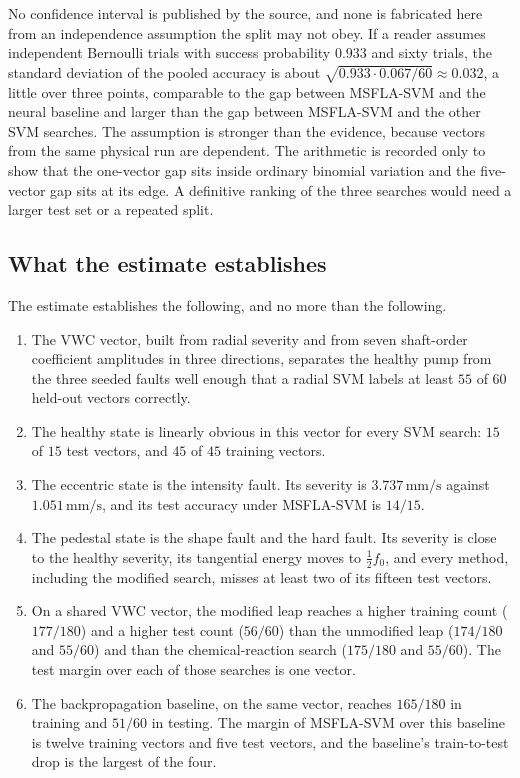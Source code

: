 No confidence interval is published by the source, and none is fabricated here from an independence assumption the split may not obey.
If a reader assumes independent Bernoulli trials with success probability \(0.933\) and sixty trials, the standard deviation of the pooled accuracy is about \(\sqrt{0.933\cdot 0.067/60}\approx 0.032\), a little over three points, comparable to the gap between MSFLA-SVM and the neural baseline and larger than the gap between MSFLA-SVM and the other SVM searches.
The assumption is stronger than the evidence, because vectors from the same physical run are dependent.
The arithmetic is recorded only to show that the one-vector gap sits inside ordinary binomial variation and the five-vector gap sits at its edge.
A definitive ranking of the three searches would need a larger test set or a repeated split.

\subsection{What the estimate establishes}

The estimate establishes the following, and no more than the following.
\begin{enumerate}
\item The VWC vector, built from radial severity and from seven shaft-order coefficient amplitudes in three directions, separates the healthy pump from the three seeded faults well enough that a radial SVM labels at least \(55\) of \(60\) held-out vectors correctly.
\item The healthy state is linearly obvious in this vector for every SVM search: \(15\) of \(15\) test vectors, and \(45\) of \(45\) training vectors.
\item The eccentric state is the intensity fault.
Its severity is \(3.737\,\mathrm{mm/s}\) against \(1.051\,\mathrm{mm/s}\), and its test accuracy under MSFLA-SVM is \(14/15\).
\item The pedestal state is the shape fault and the hard fault.
Its severity is close to the healthy severity, its tangential energy moves to \(\tfrac12 f_{0}\), and every method, including the modified search, misses at least two of its fifteen test vectors.
\item On a shared VWC vector, the modified leap reaches a higher training count (\(177/180\)) and a higher test count (\(56/60\)) than the unmodified leap (\(174/180\) and \(55/60\)) and than the chemical-reaction search (\(175/180\) and \(55/60\)).
The test margin over each of those searches is one vector.
\item The backpropagation baseline, on the same vector, reaches \(165/180\) in training and \(51/60\) in testing.
The margin of MSFLA-SVM over this baseline is twelve training vectors and five test vectors, and the baseline's train-to-test drop is the largest of the four.
\end{enumerate}

